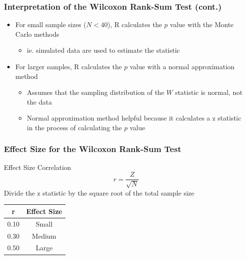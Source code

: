 \documentclass[12pt, block=fill]{beamer}
\begin{document}
\begin{frame}
  \frametitle{Interpretation of the Wilcoxon Rank-Sum Test (cont.)}
  
  \begin{itemize}
      \item For small sample sizes ($N<40$), R calculates the $p$ value with the Monte Carlo methods
      \begin{itemize}
          \item ie. simulated data are used to estimate the statistic
      \end{itemize}
      \item For larger samples, R calculates the $p$ value with a normal approximation method
      \begin{itemize}
          \item Assumes that the sampling distribution of the $W$ statistic is normal, not the data
          \item Normal approximation method helpful because it calculates a z statistic in the process of calculating the $p$ value
      \end{itemize}
  \end{itemize}
    
\end{frame}

\begin{frame}
  \frametitle{Effect Size for the Wilcoxon Rank-Sum Test}

  \begin{exampleblock}{Effect Size Correlation}
    $$r = \frac{Z}{ \sqrt{N} }$$
    Divide the z statistic by the square root of the total sample size
  \end{exampleblock}

  \begin{center}
  \begin{tabular}{c|c}
    r    & Effect Size  \\ \hline
    0.10 & Small \\
    0.30 & Medium \\
    0.50 & Large 
  \end{tabular}
  \end{center} 
\end{frame}

\end{document}
